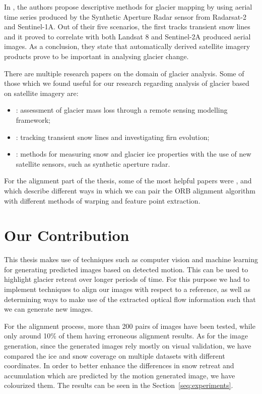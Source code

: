 \documentclass[12pt, a4paper]{report}
\begin{document}
	In \cite{WINSVOLD2017}, the authors propose descriptive methods for glacier mapping by using aerial time series produced by the Synthetic Aperture Radar sensor from Radarsat-2 and Sentinel-1A. Out of their five scenarios, the first tracks transient snow lines and it proved to correlate with both Landsat 8 and Sentinel-2A produced aerial images. As a conclusion, they state that automatically derived satellite imagery products prove to be important in analysing glacier change.
	

	\par There are multiple research papers on the domain of glacier analysis. Some of those which we found useful for our research regarding analysis of glacier based on satellite imagery are:
	\begin{itemize}
		\item \cite{parvati}: assessment of glacier mass loss through a remote sensing modelling framework;
		\item \cite{sar}: tracking transient snow lines and investigating firn evolution;
		\item \cite{msg}: methods for measuring snow and glacier ice properties with the use of new satellite sensors, such as synthetic aperture radar.
	\end{itemize}

	For the alignment part of the thesis, some of the most helpful papers were \cite{orbsift}, \cite{feorb} and \cite{orblocal} which describe different ways in which we can pair the ORB alignment algorithm with different methods of warping and feature point extraction.

	\section{Our Contribution}
	
	\par This thesis makes use of techniques such as computer vision and machine learning for generating predicted images based on detected motion. This can be used to highlight glacier retreat over longer periods of time. For this purpose we had to implement techniques to align our images with respect to a reference, as well as determining ways to make use of the extracted optical flow information such that we can generate new images.

	\par For the alignment process, more than 200 pairs of images have been tested, while only around 10\% of them having erroneous alignment results. As for the image generation, since the generated images rely mostly on visual validation, we have compared the ice and snow coverage on multiple datasets with different coordinates. In order to better enhance the differences in snow retreat and accumulation which are predicted by the motion generated image, we have colourized them. The results can be seen in the Section~\ref{seq:experiments}. 
	
\end{document}
